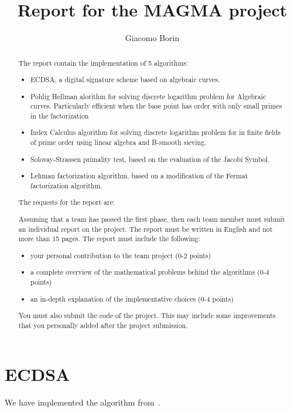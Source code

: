 \documentclass{article}
\title{Report for the MAGMA project}
\author{Giacomo Borin}
\theoremstyle{plain}
\theoremstyle{remark}
\theoremstyle{definition}
\begin{document}
\maketitle

\begin{abstract}
	The report contain the implementation of 5 algorithms:
	\begin{itemize}
		\item ECDSA, a digital signature scheme based on algebraic curves.
		\item Pohlig Hellman alorithm for solving discrete logarithm problem for Algebraic curves. Particularly efficient when the base point has order with only small primes in the factorization
		\item Index Calculus algorithm for solving discrete logarithm problem for in finite fields of prime order using linear algebra and B-smooth sieving.
		\item Solovay-Strassen primality test, based on the evaluation of the Jacobi Symbol.
		\item Lehman factorization algorithm, based on a modification of the Fermat factorization algorithm.
	\end{itemize}

	The requests for the report are:


	Assuming that a team has passed the first phase, then each team member must submit an individual report on the project. The report must be written in English and not more than 15 pages.
	The report must include the following:
	\begin{itemize}
		\item your personal contribution to the team project (0-2 points)
		\item a complete overview of the mathematical problems behind the algorithms (0-4
points)
		\item an in-depth explanation of the implementative choices (0-4 points)
	\end{itemize}
	You must also submit the code of the project. This may include some improvements that you personally added after the project submission.


\end{abstract}


\section{ECDSA}

We have implemented the algorithm from~\cite[Section 6.6]{washington}.
\end{document}

